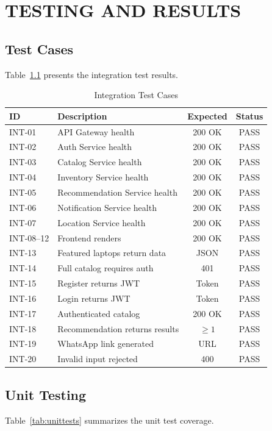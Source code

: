 \chapter{TESTING AND RESULTS}

\section{Test Cases}
Table~\ref{tab:testcases} presents the integration test results.

\begin{table}[htbp]
  \centering
  \caption{Integration Test Cases}
  \label{tab:testcases}
  \begin{tabular}{@{}llcc@{}}
    \toprule
    \textbf{ID} & \textbf{Description} & \textbf{Expected} & \textbf{Status} \\
    \midrule
    INT-01 & API Gateway health & 200 OK & PASS \\
    INT-02 & Auth Service health & 200 OK & PASS \\
    INT-03 & Catalog Service health & 200 OK & PASS \\
    INT-04 & Inventory Service health & 200 OK & PASS \\
    INT-05 & Recommendation Service health & 200 OK & PASS \\
    INT-06 & Notification Service health & 200 OK & PASS \\
    INT-07 & Location Service health & 200 OK & PASS \\
    INT-08--12 & Frontend renders & 200 OK & PASS \\
    INT-13 & Featured laptops return data & JSON & PASS \\
    INT-14 & Full catalog requires auth & 401 & PASS \\
    INT-15 & Register returns JWT & Token & PASS \\
    INT-16 & Login returns JWT & Token & PASS \\
    INT-17 & Authenticated catalog & 200 OK & PASS \\
    INT-18 & Recommendation returns results & $\geq 1$ & PASS \\
    INT-19 & WhatsApp link generated & URL & PASS \\
    INT-20 & Invalid input rejected & 400 & PASS \\
    \bottomrule
  \end{tabular}
\end{table}

\section{Unit Testing}
Table~\ref{tab:unittests} summarizes the unit test coverage.

